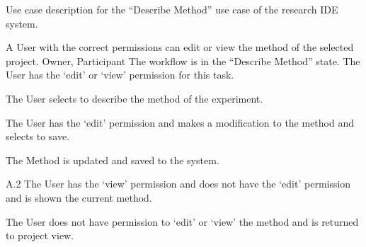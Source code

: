 \documentclass[document.tex]{subfiles}
\begin{document}
\begin{table}
  \centering
  \caption{Use case description for the ``Describe Method'' use case of the research IDE system.}
  \label{tbl:use-case-describe-method}

  \begin{usecase}
    A User with the correct permissions can edit or view the method of the selected project.
    Owner, Participant
    The workflow is in the “Describe Method” state. The User has the ‘edit’ or ‘view’ permission for this task.
    \ucnormal
    \begin{ucenum}
      \item The User selects to describe the method of the experiment.
      \item The User has the ‘edit’ permission and makes a modification to the method and selects to save.
      \item The Method is updated and saved to the system.
    \end{ucenum}
    \begin{ucenum}
      \item [A.2] The User has the ‘view’ permission and does not have the ‘edit’ permission and is shown the current method.
    \end{ucenum}
    The User does not have permission to ‘edit’ or ‘view’ the method and is returned to project view.
  \end{usecase}
\end{table}
\end{document}
